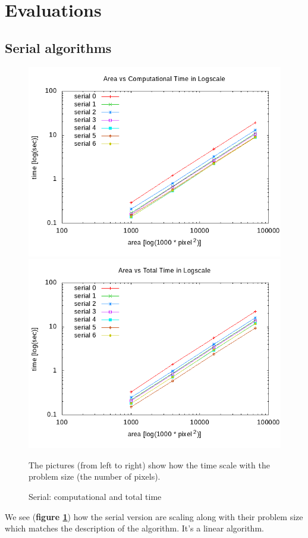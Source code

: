 \documentclass[10pt,a4paper]{article}
\begin{document}
\section{Evaluations}

\subsection{Serial algorithms}

\begin{figure}[ht]
\begin{center}
\includegraphics[width=.45\linewidth]{../../plots/areatime_compute_log.png}
\includegraphics[width=.45\linewidth]{../../plots/areatime_total_log.png}
\end{center}
\caption{Serial: computational and total time}{The pictures (from left to
right) show how the time scale with the problem size (the number of pixels).}
\label{fig:serials}
\end{figure}

We see (\textbf{figure \ref{fig:serials}}) how the serial version are scaling
along with their problem size which matches the description of the algorithm.
It's a linear algorithm.
\end{document}
